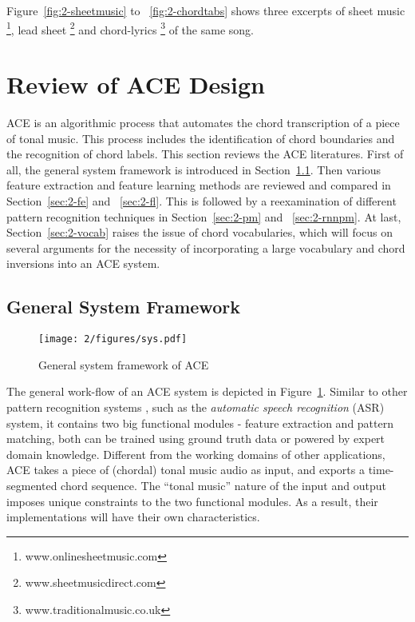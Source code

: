 Figure~\ref{fig:2-sheetmusic} to ~\ref{fig:2-chordtabs} shows three excerpts of sheet music \footnote{www.onlinesheetmusic.com}, lead sheet \footnote{www.sheetmusicdirect.com} and chord-lyrics \footnote{www.traditionalmusic.co.uk} of the same song.

\newpage
\section{Review of ACE Design} \label{sec:2-review}
ACE is an algorithmic process that automates the chord transcription of a piece of tonal music. This process includes the identification of chord boundaries and the recognition of chord labels. This section reviews the ACE literatures. First of all, the general system framework is introduced in Section~\ref{sec:2-sys}. Then various feature extraction and feature learning methods are reviewed and compared in Section~\ref{sec:2-fe} and ~\ref{sec:2-fl}. This is followed by a reexamination of different pattern recognition techniques in Section~\ref{sec:2-pm} and ~\ref{sec:2-rnnpm}. At last, Section~\ref{sec:2-vocab} raises the issue of chord vocabularies, which will focus on several arguments for the necessity of incorporating a large vocabulary and chord inversions into an ACE system.


\subsection{General System Framework} \label{sec:2-sys}

\begin{figure}[htb]
\centering
\texttt{[image: 2/figures/sys.pdf]}
\caption{General system framework of ACE}
\label{fig:2-sys}
\end{figure}

The general work-flow of an ACE system is depicted in Figure~\ref{fig:2-sys}. Similar to other pattern recognition systems \cite{duda2012pattern}, such as the \textit{automatic speech recognition} (ASR) \cite{huang2001spoken} system, it contains two big functional modules - feature extraction and pattern matching, both can be trained using ground truth data or powered by expert domain knowledge. Different from the working domains of other applications, ACE takes a piece of (chordal) tonal music audio as input, and exports a time-segmented chord sequence. The ``tonal music'' nature of the input and output imposes unique constraints to the two functional modules. As a result, their implementations will have their own characteristics.

